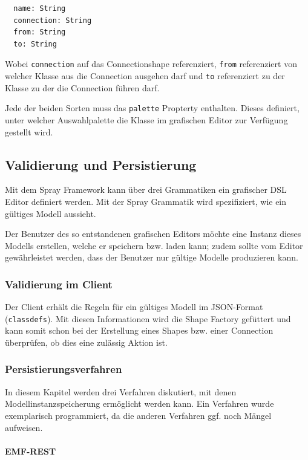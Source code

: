 \begin{verbatim}
  name: String
  connection: String
  from: String
  to: String
\end{verbatim}

\noindent Wobei {\tt connection} auf das Connectionshape referenziert,
{\tt from} referenziert von welcher Klasse aus die Connection ausgehen darf
und {\tt to} referenziert zu der Klasse zu der die Connection führen darf.

Jede der beiden Sorten muss das {\tt palette} Propterty enthalten.
Dieses definiert, unter welcher Auswahlpalette die Klasse im grafischen Editor
zur Verfügung gestellt wird.

\subsection{Validierung und Persistierung}

Mit dem Spray Framework kann über drei Grammatiken ein grafischer DSL
Editor definiert werden. Mit der Spray Grammatik wird spezifiziert,
wie ein gültiges Modell aussieht.

Der Benutzer des so entstandenen grafischen Editors möchte eine Instanz
dieses Modells erstellen, welche er speichern bzw. laden kann;
zudem sollte vom Editor gewährleistet werden, dass der Benutzer nur
gültige Modelle produzieren kann.

\subsubsection{Validierung im Client}

Der Client erhält die Regeln für ein gültiges Modell im JSON-Format
({\tt classdefs}). Mit diesen Informationen wird die Shape Factory gefüttert
und kann somit schon bei der Erstellung eines Shapes bzw. einer Connection
überprüfen, ob dies eine zulässig Aktion ist.

\subsubsection{Persistierungsverfahren}

In diesem Kapitel werden drei Verfahren diskutiert, mit denen Modellinstanzspeicherung
ermöglicht werden kann.
Ein Verfahren wurde exemplarisch programmiert, da die anderen Verfahren ggf. noch
Mängel aufweisen.

\paragraph{EMF-REST}

